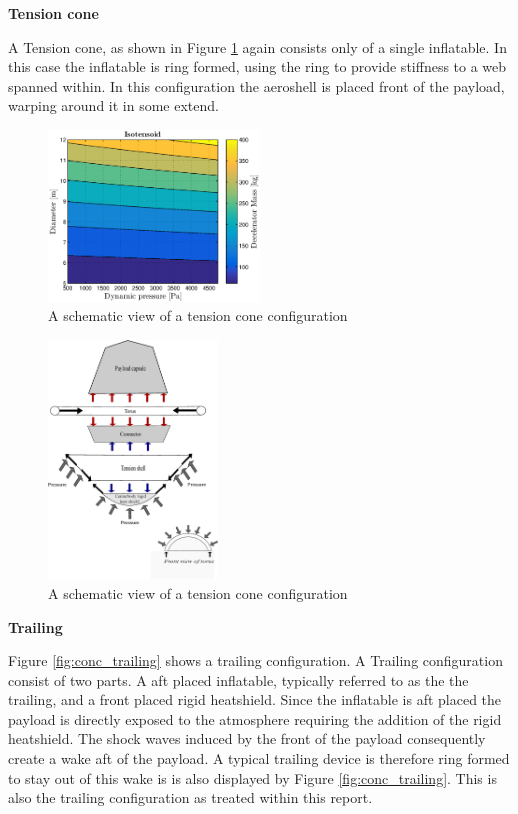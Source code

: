\textbf{Tension cone}

A Tension cone, as shown in Figure \ref{fig:conc_tension} again consists only of a single inflatable. In this case the inflatable is ring formed, using the ring to provide stiffness to a web spanned within. In this configuration the aeroshell is placed front of the payload, warping around it in some extend.

\begin{figure}[H]
\centering
\includegraphics[width = 0.5\textwidth]{Figure/ISO_comp.eps}
\caption{A schematic view of a tension cone configuration}
\label{fig:conc_tension}
\end{figure}

\begin{figure}[H]
\centering
\includegraphics[width = 0.4\textwidth]{Figure/FBD_tensioncone.eps}
\caption{A schematic view of a tension cone configuration}
\label{fig:fbd_tension}
\end{figure}

\textbf{Trailing}

Figure \ref{fig:conc_trailing} shows a trailing configuration. A Trailing configuration consist of two parts. A aft placed inflatable, typically referred to as the the trailing, and a front placed rigid heatshield. Since the inflatable is aft placed the payload is directly exposed to the atmosphere requiring the addition of the rigid heatshield. The shock waves induced by the front of the payload consequently create a wake aft of the payload. A typical trailing device is therefore ring formed to stay out of this wake is is also displayed by Figure \ref{fig:conc_trailing}. This is also the trailing configuration as treated within this report.

